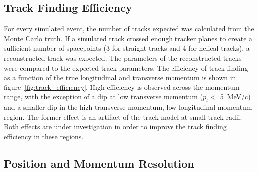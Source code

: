 

  \subsection{Track Finding Efficiency}
  \label{sec:performance:track_finding}
  For every simulated event, the number of tracks expected was calculated from the Monte Carlo truth. If a simulated track crossed enough tracker planes to create a sufficient number of spacepoints (3 for straight tracks and 4 for helical tracks), a reconstructed track was expected. The parameters of the reconstructed tracks were compared to the expected track parameters. The efficiency of track finding as a function of the true longitudinal and transverse momentum is shown in figure~\ref{fig:track_efficiency}. High efficiency is observed across the momentum range, with the exception of a dip at low transverse momentum ($p_t <$ 5~MeV/c) and a smaller dip in the high transverse momentum, low longitudinal momentum region. The former effect is an artifact of the track model at small track radii. Both effects are under investigation in order to improve the track finding efficiency in these regions.


  \subsection{Position and Momentum Resolution}
  \label{sec:performance:resolutions}
  
  
